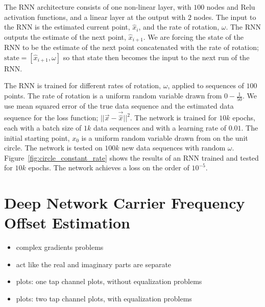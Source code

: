 The RNN architecture consists of one non-linear layer, with $100$ nodes and Relu activation functions, and a linear layer at the output with $2$ nodes. The input to the RNN is the estimated current point, $\hat{x}_i$, and the rate of rotation, $\omega$.  The RNN outputs the estimate of the next point, $\hat{x}_{i+1}$.  We are forcing the state of the RNN to be the estimate of the next point concatenated with the rate of rotation; $\text{state} = [\hat{x}_{i+1},\omega]$ so that state then becomes the input to the next run of the RNN.

The RNN is trained for different rates of rotation, $\omega$, applied to sequences of $100$ points.
The rate of rotation is a uniform random variable drawn from $0-\frac{1}{50}$.
We use mean squared error of the true data sequence and the estimated data sequence for the loss function; $||\vec{x}-\vec{\hat{x}}||^2$.  The network is trained for $10k$ epochs, each with a batch size of $1k$ data sequences and with a learning rate of $0.01$.  The initial starting point, $x_0$ is a uniform random variable drawn from on the unit circle.
The network is tested on $100k$ new data sequences with random $\omega$.
Figure~\ref{fig:circle_constant_rate} shows the results of an RNN trained and tested for $10k$ epochs.  The network achieves a loss on the order of $10^{-5}$.


\section{Deep Network Carrier Frequency Offset Estimation}
\begin{itemize}
\item complex gradients problems
\item act like the real and imaginary parts are separate
\item plots: one tap channel plots, without equalization problems
\item plots: two tap channel plots, with equalization problems
\end{itemize}

